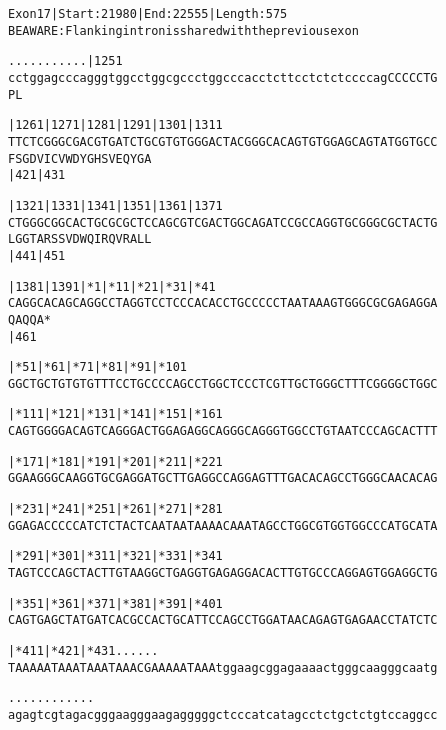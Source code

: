 \documentclass{article}
\begin{document}
\begin{alltt}
Exon 17 | Start: 21980 | End: 22555 | Length: 575
BE AWARE: Flanking intron is shared with the previous exon

.    .    .    .    .    .    .    .    .    .    .  |1251  
cctggagcccagggtggcctggcgccctggcccacctcttcctctctccccagCCCCCTG
                                                      P  L  

   |1261     |1271     |1281     |1291     |1301     |1311  
TTCTCGGGCGACGTGATCTGCGTGTGGGACTACGGGCACAGTGTGGAGCAGTATGGTGCC
F  S  G  D  V  I  C  V  W  D  Y  G  H  S  V  E  Q  Y  G  A  
   |421                          |431                       

   |1321     |1331     |1341     |1351     |1361     |1371  
CTGGGCGGCACTGCGCGCTCCAGCGTCGACTGGCAGATCCGCCAGGTGCGGGCGCTACTG
L  G  G  T  A  R  S  S  V  D  W  Q  I  R  Q  V  R  A  L  L  
   |441                          |451                       

   |1381     |1391|*1       |*11      |*21      |*31      |*41
CAGGCACAGCAGGCCTAGGTCCTCCCACACCTGCCCCCTAATAAAGTGGGCGCGAGAGGA
Q  A  Q  Q  A  *   
   |461                                                     

        |*51      |*61      |*71      |*81      |*91      |*101
GGCTGCTGTGTGTTTCCTGCCCCAGCCTGGCTCCCTCGTTGCTGGGCTTTCGGGGCTGGC

        |*111     |*121     |*131     |*141     |*151     |*161
CAGTGGGGACAGTCAGGGACTGGAGAGGCAGGGCAGGGTGGCCTGTAATCCCAGCACTTT

        |*171     |*181     |*191     |*201     |*211     |*221
GGAAGGGCAAGGTGCGAGGATGCTTGAGGCCAGGAGTTTGACACAGCCTGGGCAACACAG

        |*231     |*241     |*251     |*261     |*271     |*281
GGAGACCCCCATCTCTACTCAATAATAAAACAAATAGCCTGGCGTGGTGGCCCATGCATA

        |*291     |*301     |*311     |*321     |*331     |*341
TAGTCCCAGCTACTTGTAAGGCTGAGGTGAGAGGACACTTGTGCCCAGGAGTGGAGGCTG

        |*351     |*361     |*371     |*381     |*391     |*401
CAGTGAGCTATGATCACGCCACTGCATTCCAGCCTGGATAACAGAGTGAGAACCTATCTC

        |*411     |*421     |*431.    .    .    .    .    . 
TAAAAATAAATAAATAAACGAAAAATAAAtggaagcggagaaaactgggcaagggcaatg

   .    .    .    .    .    .    .    .    .    .    .    . 
agagtcgtagacgggaagggaagagggggctcccatcatagcctctgctctgtccaggcc

\end{alltt}
\end{document}
